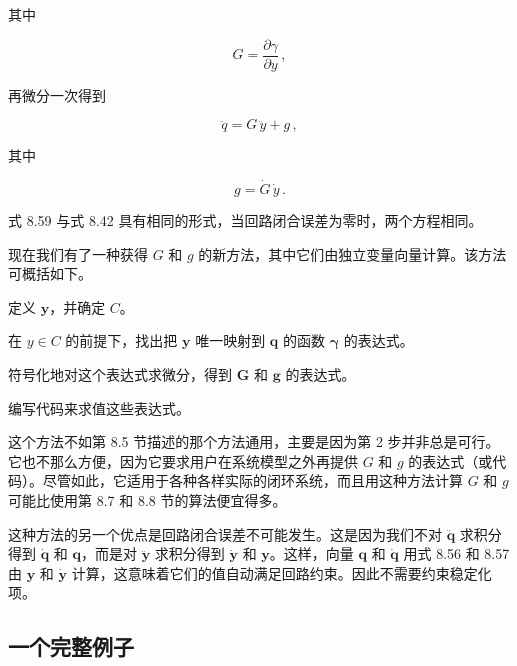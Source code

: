 \documentclass[10pt,a4paper]{book}
\theoremstyle{thmstyle} %
\theoremstyle{defstyle} %
\theoremstyle{prostyle} %
\begin{document}
其中



$$
G = \frac { \partial \gamma } { \partial y } \, ,
$$



再微分一次得到



$$
\ddot { q } = G \, \ddot { y } + g \, ,
$$



其中



$$
g = \dot { G } \, \dot { y } \, .
$$



式 8.59 与式 8.42 具有相同的形式，当回路闭合误差为零时，两个方程相同。



现在我们有了一种获得 $G$ 和 $g$ 的新方法，其中它们由独立变量向量计算。该方法可概括如下。



定义 $\boldsymbol{y}$，并确定 $C$。



在 $y \in C$ 的前提下，找出把 $\boldsymbol{y}$ 唯一映射到 $\boldsymbol{q}$ 的函数 $\boldsymbol{\gamma}$ 的表达式。



符号化地对这个表达式求微分，得到 $\boldsymbol{G}$ 和 $\boldsymbol{g}$ 的表达式。



编写代码来求值这些表达式。



这个方法不如第 8.5 节描述的那个方法通用，主要是因为第 2 步并非总是可行。它也不那么方便，因为它要求用户在系统模型之外再提供 $G$ 和 $g$ 的表达式（或代码）。尽管如此，它适用于各种各样实际的闭环系统，而且用这种方法计算 $G$ 和 $g$ 可能比使用第 8.7 和 8.8 节的算法便宜得多。



这种方法的另一个优点是回路闭合误差不可能发生。这是因为我们不对 $\ddot{\boldsymbol{q}}$ 求积分得到 $\dot{\boldsymbol{q}}$ 和 $\boldsymbol{q}$，而是对 $\ddot{\boldsymbol{y}}$ 求积分得到 $\dot{\boldsymbol{y}}$ 和 $\boldsymbol{y}$。这样，向量 $\boldsymbol{q}$ 和 $\dot{\boldsymbol{q}}$ 用式 8.56 和 8.57 由 $\boldsymbol{y}$ 和 $\dot{\boldsymbol{y}}$ 计算，这意味着它们的值自动满足回路约束。因此不需要约束稳定化项。



\subsection{一个完整例子}
\end{document}
